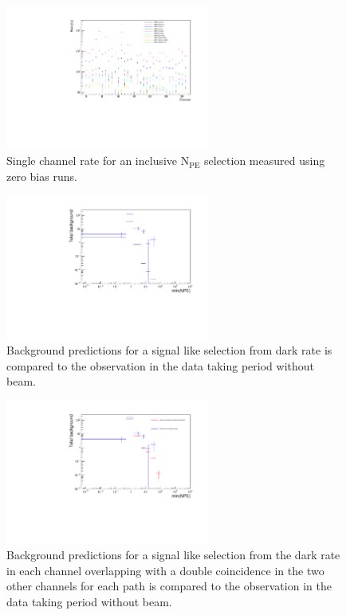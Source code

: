 \documentclass[12pt]{article}
\newcommand{\npe} {\mbox{\ensuremath{\textrm{N}_\textrm{PE}}}\xspace}
\begin{document}
\begin{figure}[ht!]
    \centering
    \includegraphics[width=0.6\textwidth]{figures/singlesRatesUnbiasedQuietSinglePulseInChanHeightAllUnbiasedBinnedAsSignal}
    \caption{\label{fig:darkRate} Single channel rate for an inclusive \npe selection measured using zero bias runs.}
\end{figure}

\begin{figure}[ht!]
    \centering
    \includegraphics[width=0.6\textwidth]{figures/predictionAndMeasurementTimeWindow15}
    \caption{\label{fig:darkRateSingle} Background predictions for a signal like selection
    from dark rate is compared to the observation in the data taking period without beam.} 
\end{figure}

\begin{figure}[ht!]
    \centering
    \includegraphics[width=0.6\textwidth]{figures/predictionAndMeasurementFromDoubleAndSingleTimeWindow15}
    \caption{\label{fig:darkRateDouble} Background predictions for a signal like selection
    from the dark rate in each channel overlapping with a double coincidence in the two other
    channels for each path is compared to the observation in the data taking period without beam.} 
\end{figure}
\end{document}

